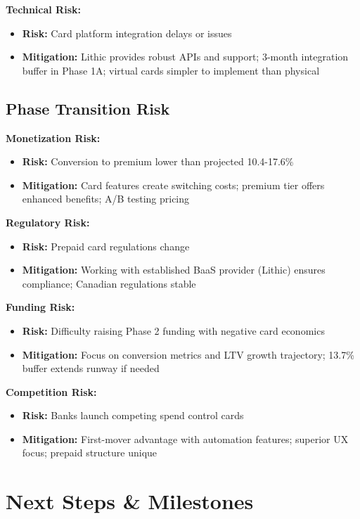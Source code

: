 \documentclass[11pt,letterpaper]{article}
\begin{document}
\textbf{Technical Risk:}
\begin{itemize}
\item \textbf{Risk:} Card platform integration delays or issues
\item \textbf{Mitigation:} Lithic provides robust APIs and support; 3-month integration buffer in Phase 1A; virtual cards simpler to implement than physical
\end{itemize}

\subsection{Phase Transition Risk}

\textbf{Monetization Risk:}
\begin{itemize}
\item \textbf{Risk:} Conversion to premium lower than projected 10.4-17.6\%
\item \textbf{Mitigation:} Card features create switching costs; premium tier offers enhanced benefits; A/B testing pricing
\end{itemize}

\textbf{Regulatory Risk:}
\begin{itemize}
\item \textbf{Risk:} Prepaid card regulations change
\item \textbf{Mitigation:} Working with established BaaS provider (Lithic) ensures compliance; Canadian regulations stable
\end{itemize}

\textbf{Funding Risk:}
\begin{itemize}
\item \textbf{Risk:} Difficulty raising Phase 2 funding with negative card economics
\item \textbf{Mitigation:} Focus on conversion metrics and LTV growth trajectory; 13.7\% buffer extends runway if needed
\end{itemize}

\textbf{Competition Risk:}
\begin{itemize}
\item \textbf{Risk:} Banks launch competing spend control cards
\item \textbf{Mitigation:} First-mover advantage with automation features; superior UX focus; prepaid structure unique
\end{itemize}

\newpage

\section{Next Steps \& Milestones}
\end{document}
